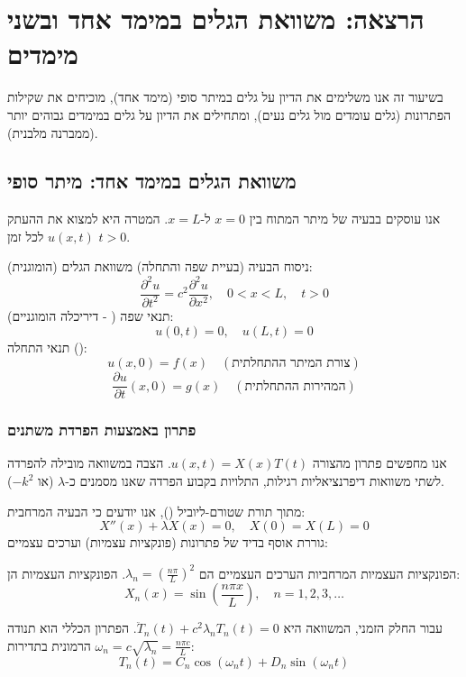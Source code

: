 \section{הרצאה: משוואת הגלים במימד אחד ובשני מימדים}

בשיעור זה אנו משלימים את הדיון על גלים במיתר סופי (מימד אחד), מוכיחים את שקילות הפתרונות (גלים עומדים מול גלים נעים), ומתחילים את הדיון על גלים במימדים גבוהים יותר (ממברנה מלבנית).

\subsection{משוואת הגלים במימד אחד: מיתר סופי}

אנו עוסקים בבעיה של מיתר המתוח בין $x=0$ ל-$x=L$. המטרה היא למצוא את ההעתק $u(x,t)$ לכל זמן $t>0$.

\begin{definitionbox}{ניסוח הבעיה (בעיית שפה והתחלה)}
משוואת הגלים (הומוגנית):
$$\frac{\partial^2 u}{\partial t^2} = c^2 \frac{\partial^2 u}{\partial x^2}, \quad 0 < x < L, \quad t > 0$$
תנאי שפה ( - דיריכלה הומוגניים):
$$u(0,t) = 0, \quad u(L,t) = 0$$
תנאי התחלה ():
$$u(x,0) = f(x) \quad (\text{צורת המיתר ההתחלתית})$$
$$\frac{\partial u}{\partial t}(x,0) = g(x) \quad (\text{המהירות ההתחלתית})$$
\end{definitionbox}

\subsubsection{פתרון באמצעות הפרדת משתנים}
אנו מחפשים פתרון מהצורה $u(x,t) = X(x)T(t)$. הצבה במשוואה מובילה להפרדה לשתי משוואות דיפרנציאליות רגילות, התלויות בקבוע הפרדה שאנו מסמנים כ-$\lambda$ (או $-k^2$).

מתוך תורת שטורם-ליוביל (), אנו יודעים כי הבעיה המרחבית:
$$X''(x) + \lambda X(x) = 0, \quad X(0)=X(L)=0$$
גוררת אוסף בדיד של פתרונות (פונקציות עצמיות) וערכים עצמיים:

\begin{resultbox}{הפונקציות העצמיות המרחביות}
הערכים העצמיים הם $\lambda_n = \left(\frac{n\pi}{L}\right)^2$.
הפונקציות העצמיות הן:
$$X_n(x) = \sin\left(\frac{n\pi x}{L}\right), \quad n=1,2,3,\dots$$
\end{resultbox}

עבור החלק הזמני, המשוואה היא $\ddot{T}_n(t) + c^2 \lambda_n T_n(t) = 0$. הפתרון הכללי הוא תנודה הרמונית בתדירות $\omega_n = c\sqrt{\lambda_n} = \frac{n\pi c}{L}$:
$$T_n(t) = C_n \cos(\omega_n t) + D_n \sin(\omega_n t)$$

